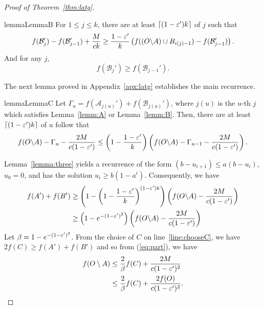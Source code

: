 \begin{proof}[Proof of Theorem~\ref{thm:latg}]
\begin{restatable}{lemma}{LemmaB} 
  \label{lemm:B}
  For $1 \le j \le k$, there are at least $\lceil(1-\varepsilon')k\rceil$ of $j$ such that
    $$f(\mathcal{B}_j')-f(\mathcal{B}_{j-1}')+\frac{M}{ck}\ge 
    \frac{1-\varepsilon'}{k}\left(f((O\backslash A)\cup B_{i(j)-1})-f(\mathcal{B}_{j-1}')\right).$$
    And for any $j$,
    $$f(\mathcal{B}_j')\ge f(\mathcal{B}_{j-1}').$$
\end{restatable}

The next lemma proved in Appendix~\ref{apx:latg} establishes the main recurrence.
\begin{restatable}{lemma}{LemmaC} 
  \label{lemma:three}
  Let $\Gamma_u=f(\mathcal{A}_{j(u)}')+f(\mathcal{B}_{j(u)}')$, 
    where $j(u)$ is the $u$-th $j$ which satisfies
    Lemma~\ref{lemm:A} or Lemma~\ref{lemm:B}.
    Then, there are at least $\lceil(1-\varepsilon')k\rceil$ of $u$ follow that
    $$f(O\backslash A)-\Gamma_u-\frac{2M}{c(1-\varepsilon')}\le 
    \left(1-\frac{1-\varepsilon'}{k}\right)\left(f(O\backslash A)-
    \Gamma_{u-1}-\frac{2M}{c(1-\varepsilon')}\right).$$
  \end{restatable}

Lemma~\ref{lemma:three} yields a recurrence of the form 
$\left(b-u_{i+1}\right) \le a\left(b-u_{i}\right)$, $u_0 = 0$,
and has the solution $u_i \ge b(1 - a^i)$.
Consequently, we have 
\begin{align} \label{eq:part}
f(A') + f(B') &\ge \left(1-\left(1-\frac{1-\varepsilon'}{k}\right)^{(1-\varepsilon')k}\right)
\left(f(O \backslash A) - \frac{2M}{c(1-\varepsilon')}\right) \nonumber \\
& \ge \left(1-e^{-(1-\varepsilon')^2}\right)
\left(f(O \backslash A) - \frac{2M}{c(1-\varepsilon')}\right)
\end{align}
Let $\beta = 1 - e^{-(1 - \varepsilon')^2}$. From
the choice of $C$ on line~\ref{line:chooseC}, we have $2f(C) \ge f(A') + f(B')$ and
so from (\ref{eq:part}), we have 
\begin{align} \label{eq:part3}
f(O \setminus A) &\le \frac{2}{\beta} f(C) + \frac{2M}{c(1 - \varepsilon')^2} \nonumber \\ 
&\le \frac{2}{\beta} f(C) + \frac{2f(O)}{c(1 - \varepsilon')^2}.
\end{align}


\end{proof}
